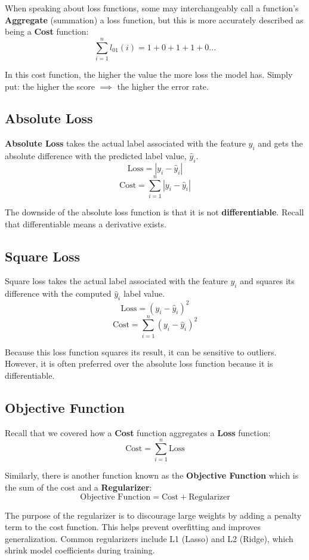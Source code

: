 \documentclass[12pt]{article}
\begin{document}
When speaking about loss functions, some may interchangeably call a function's \textbf{Aggregate} (summation) a loss function, but this is more accurately described as being a \textbf{Cost} function:
\[ 
\sum_{i=1}^{n} l_{01}(i) = 1 + 0 + 1 + 1 + 0 . . . 
\]

In this cost function, the higher the value the more loss the model has. Simply put: the higher the score \(\implies\) the higher the error rate. 

\subsection{Absolute Loss}
\textbf{Absolute Loss} takes the actual label associated with the feature \(y_i\) and gets the absolute difference with the predicted label value, \(\hat{y}_i\).
\[
\text{Loss} = |y_i - \hat{y}_i|
\]
\[
\text{Cost} = \sum_{i=1}^{n} |y_i - \hat{y}_i|
\]

The downside of the absolute loss function is that it is not \textbf{differentiable}. Recall that differentiable means a derivative exists.

\subsection{Square Loss}
Square loss takes the actual label associated with the feature \(y_i\) and squares its difference with the computed \(\hat{y}_i\) label value.
\[
\text{Loss} = (y_i - \hat{y}_i)^2
\]
\[
\text{Cost} = \sum_{i=1}^{n} (y_i - \hat{y}_i)^2
\]

Because this loss function squares its result, it can be sensitive to outliers. However, it is often preferred over the absolute loss function because it is differentiable.

\subsection{Objective Function}
Recall that we covered how a \textbf{Cost} function aggregates a \textbf{Loss} function:
\[
\text{Cost} = \sum_{i=1}^{n} \text{Loss}
\]

Similarly, there is another function known as the \textbf{Objective Function} which is the sum of the cost and a \textbf{Regularizer}:
\[
\text{Objective Function} = \text{Cost} + \text{Regularizer}
\]

The purpose of the regularizer is to discourage large weights by adding a penalty term to the cost function. This helps prevent overfitting and improves generalization. Common regularizers include L1 (Lasso) and L2 (Ridge), which shrink model coefficients during training.
\end{document}
